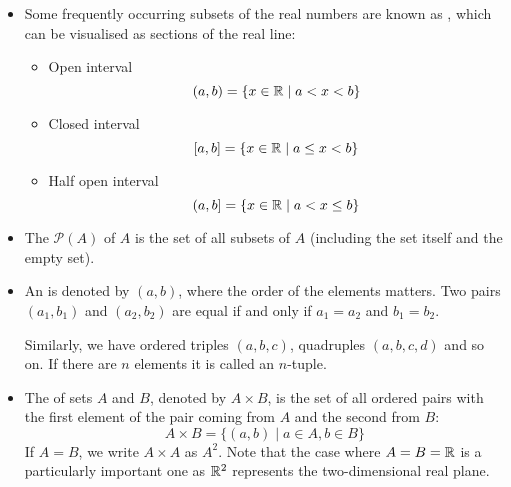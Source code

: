 \begin{itemize}
To prove that $A$ and $B$ are equal, we simply need to prove that $A \subseteq B$ and $A \subseteq B$.

\begin{proof}
We have 
\begin{align*}
A = B &\iff (\forall x)[x \in A \iff x \in B] \\
&\iff (\forall x)[(x \in A \implies x \in B) \land (x \in B \implies x \in A)] \\
&\iff \{(\forall x)[x \in A \implies x \in B]\} \land {(\forall x)[x \in B \implies x \in A)]} \\
&\iff (A \subseteq B) \land (B \subseteq A)
\end{align*}
\end{proof}

\item Some frequently occurring subsets of the real numbers are known as , which can be visualised as sections of the real line:
\begin{itemize}
\item Open interval
\[ (a,b) = \{x\in\mathbb R \mid a<x<b\} \]
\item Closed interval
\[ [a,b] = \{x\in\mathbb R \mid a\le x<b\} \]
\item Half open interval
\[ (a,b] = \{x\in\mathbb R \mid a<x\le b\} \]
\end{itemize}

\item The  $\mathcal{P}(A)$ of $A$ is the set of all subsets of $A$ (including the set itself and the empty set).

\item An  is denoted by $(a,b)$, where the order of the elements matters. Two pairs $(a_1,b_1)$ and $(a_2,b_2)$ are equal if and only if $a_1=a_2$ and $b_1=b_2$. 

Similarly, we have ordered triples $(a,b,c)$, quadruples $(a,b,c,d)$ and so on. If there are $n$ elements it is called an $n$-tuple.

\item The  of sets $A$ and $B$, denoted by $A \times B$, is the set of all ordered pairs with the first element of the pair coming from $A$ and the
second from $B$:
\begin{equation}
A \times B = \{(a,b) \mid a \in A, b \in B\}
\end{equation}
If $A = B$, we write $A \times A$ as $A^2$. Note that the case where $A = B = \mathbb R$ is a particularly important one as $\mathbb R^2$ represents the two-dimensional real plane.


\end{itemize}
